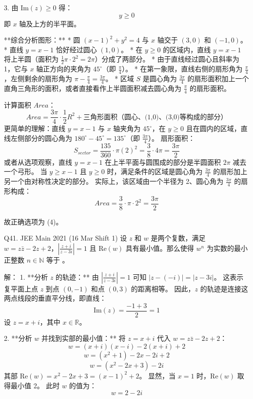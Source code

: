 \begin{questions}
\begin{solution}
3. 由 $\text{Im}(z) \geq 0$ 得：
\[
y \geq 0
\]
即 $x$ 轴及上方的半平面。

**综合分析图形：**
* 圆 $(x - 1)^2 + y^2 = 4$ 与 $x$ 轴交于 $(3, 0)$ 和 $(-1, 0)$。
* 直线 $y = x - 1$ 恰好经过圆心 $(1, 0)$。
* 在 $y \geq 0$ 的区域内，直线 $y = x - 1$ 将上半圆（面积为 $\frac{1}{2} \pi \cdot 2^2 = 2\pi$）分成了两部分。
* 由于直线经过圆心且斜率为 1，它与 $x$ 轴正方向的夹角为 $45^\circ$（即 $\frac{\pi}{4}$）。
* 在第一象限，直线右侧的扇形角为 $\frac{\pi}{4}$，左侧剩余的扇形角为 $\pi - \frac{\pi}{4} = \frac{3\pi}{4}$。
* 区域 $S$ 是圆心角为 $\frac{3\pi}{4}$ 的扇形面积加上一个直角三角形的面积，或者直接看作上半圆面积减去圆心角为 $\frac{\pi}{4}$ 的扇形面积。

计算面积 $Area$：
\[
Area = \frac{3\pi}{4} \cdot \frac{1}{2} R^2 + \text{三角形面积（圆心、(1,0)、(3,0)等构成的部分）}
\]
更简单的理解：直线 $y = x - 1$ 与 $x$ 轴夹角为 $45^\circ$，在 $y \geq 0$ 且在圆内的区域，直线左侧部分的圆心角为 $180^\circ - 45^\circ = 135^\circ$（即 $\frac{3\pi}{4}$）。
扇形面积：
\[
S_{sector} = \frac{135}{360} \cdot \pi (2)^2 = \frac{3}{8} \cdot 4\pi = \frac{3\pi}{2}
\]
或者从选项观察，直线 $y = x - 1$ 在上半平面与圆围成的部分是半圆面积 $2\pi$ 减去一个弓形。
当 $y \geq x - 1$ 且 $y \geq 0$ 时，满足条件的区域是圆心角为 $\frac{3\pi}{4}$ 的扇形加上另一个由对称性决定的部分。
实际上，该区域由一个半径为 2、圆心角为 $\frac{3\pi}{4}$ 的扇形构成：
\[
Area = \frac{3}{8} \cdot \pi \cdot 2^2 = \frac{3\pi}{2}
\]

故正确选项为 (4)。
\end{solution}

\question Q41. JEE Main 2021 (16 Mar Shift 1)
设 $z$ 和 $w$ 是两个复数，满足 $w = z\bar{z} - 2z + 2$，$\left| \frac{z+i}{z-3i} \right| = 1$ 且 $\text{Re}(w)$ 具有最小值。那么使得 $w^n$ 为实数的最小正整数 $n \in \mathbb{N}$ 等于 \underline{\hspace{1cm}}。

\begin{solution}
解：
1. **分析 $z$ 的轨迹：**
由 $\left| \frac{z+i}{z-3i} \right| = 1$ 可知 $|z - (-i)| = |z - 3i|$。
这表示复平面上点 $z$ 到点 $(0, -1)$ 和点 $(0, 3)$ 的距离相等。
因此，$z$ 的轨迹是连接这两点线段的垂直平分线，即直线：
\[ \text{Im}(z) = \frac{-1 + 3}{2} = 1 \]
设 $z = x + i$，其中 $x \in \mathbb{R}$。

2. **分析 $w$ 并找到实部的最小值：**
将 $z = x + i$ 代入 $w = z\bar{z} - 2z + 2$：
\[ w = (x+i)(x-i) - 2(x+i) + 2 \]
\[ w = (x^2 + 1) - 2x - 2i + 2 \]
\[ w = (x^2 - 2x + 3) - 2i \]
其部 $\text{Re}(w) = x^2 - 2x + 3 = (x-1)^2 + 2$。
显然，当 $x = 1$ 时，$\text{Re}(w)$ 取得最小值 2。
此时 $w$ 的值为：
\[ w = 2 - 2i \]


\end{solution}
\end{questions}
